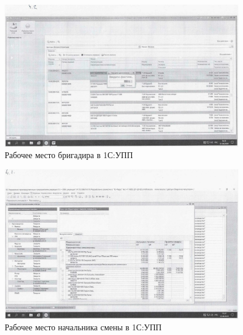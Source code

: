 \begin{figure}
\begin{center}
  \includegraphics[height=0.94\textheight, width=0.94\textwidth, keepaspectratio]{Pics 1/4.2 рабочее место бригадира в УПП_0001.jpg}
\end{center}
  \caption{Рабочее место бригадира в 1С:УПП}
  \label{pic:4.2 рабочее место бригадира в УПП_0001}
\end{figure}

\begin{figure}
\begin{center}
  \includegraphics[height=0.94\textheight, width=0.94\textwidth, keepaspectratio]{Pics 1/4.1 рабочее место начсмены в упп_0001.jpg}
\end{center}
  \caption{Рабочее место начальника смены в 1С:УПП}
  \label{pic:4.1 рабочее место начсмены в упп_0001}
\end{figure}

